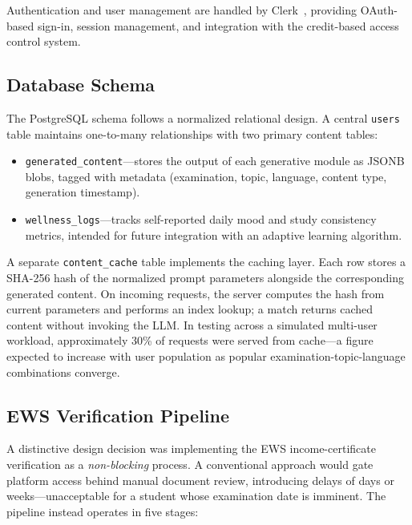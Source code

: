 \documentclass[conference]{IEEEtran}
\begin{document}
Authentication and user management are handled by Clerk~\cite{clerk}, providing OAuth-based sign-in, session management, and integration with the credit-based access control system.

\subsection{Database Schema}

The PostgreSQL schema follows a normalized relational design. A central \texttt{users} table maintains one-to-many relationships with two primary content tables:

\begin{itemize}[leftmargin=*]
    \item \texttt{generated\_content}---stores the output of each generative module as JSONB blobs, tagged with metadata (examination, topic, language, content type, generation timestamp).
    \item \texttt{wellness\_logs}---tracks self-reported daily mood and study consistency metrics, intended for future integration with an adaptive learning algorithm.
\end{itemize}

A separate \texttt{content\_cache} table implements the caching layer. Each row stores a SHA-256 hash of the normalized prompt parameters alongside the corresponding generated content. On incoming requests, the server computes the hash from current parameters and performs an index lookup; a match returns cached content without invoking the LLM. In testing across a simulated multi-user workload, approximately 30\% of requests were served from cache---a figure expected to increase with user population as popular examination-topic-language combinations converge.

\subsection{EWS Verification Pipeline}
\label{sec:ews}

A distinctive design decision was implementing the EWS income-certificate verification as a \textit{non-blocking} process. A conventional approach would gate platform access behind manual document review, introducing delays of days or weeks---unacceptable for a student whose examination date is imminent. The pipeline instead operates in five stages:
\end{document}
